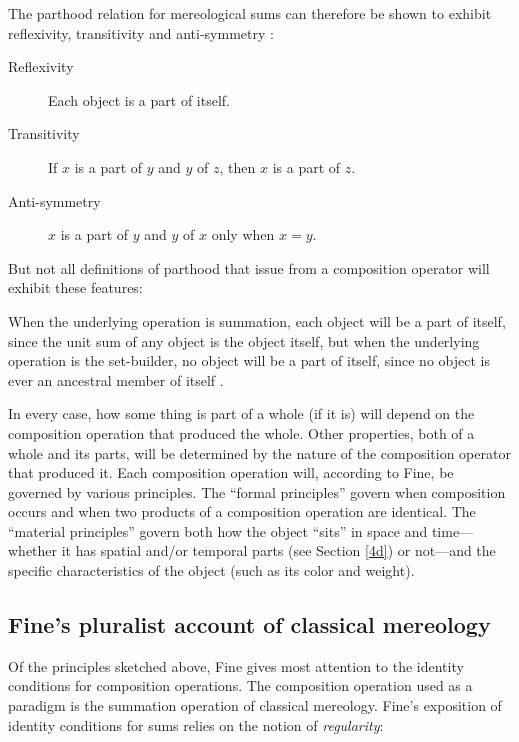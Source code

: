 \documentclass[11pt]{article}
\newenvironment{squote}{%
\begin{spacing}{1}
\begin{list}{}{%
\setlength{\labelwidth}{0pt}%
\rightmargin\leftmargin%
}
\item\relax
}{%
\end{list}%
\end{spacing}
}
\begin{document}
\begin{spacing}{1.5}
The parthood relation for mereological sums can therefore be shown to
exhibit reflexivity, transitivity and anti-symmetry
\citep[568]{fine2010}:

\begin{description}
\item[Reflexivity] Each object is a part of itself.
\item[Transitivity] If $x$ is a part of $y$ and $y$ of $z$, then $x$
  is a part of $z$.
\item[Anti-symmetry] $x$ is a part of $y$ and $y$ of $x$ only when $x
  = y$.
\end{description}

But not all definitions of parthood that issue from a composition
operator will exhibit these features:

\begin{squote}
When the underlying operation is summation, each object will be a part
of itself, since the unit sum of any object is the object itself, but
when the underlying operation is the set-builder, no object will be a
part of itself, since no object is ever an ancestral member of itself
\citep[569]{fine2010}.
\end{squote}

In every case, how some thing is part of a whole (if it is) will
depend on the composition operation that produced the whole.  Other
properties, both of a whole and its parts, will be determined by the
nature of the composition operator that produced it.  Each composition
operation will, according to Fine, be governed by various principles.
The ``formal principles'' govern when composition occurs and when two
products of a composition operation are identical.  The ``material
principles'' govern both how the object ``sits'' in space and
time---whether it has spatial and/or temporal parts (see Section
\ref{4d}) or not---and the specific characteristics of the object
(such as its color and weight).

\subsection{Fine's pluralist account of classical mereology}
\label{classical}
Of the principles sketched above, Fine gives most attention to the
identity conditions for composition operations.  The composition
operation used as a paradigm is the summation operation of classical
mereology.  Fine's exposition of identity conditions for sums relies
on the notion of {\em regularity}:


\end{spacing}
\end{document}
